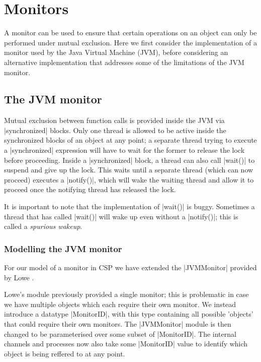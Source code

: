 \inlineCSP
\section{Monitors}

A monitor can be used to ensure that certain operations on an object can only be performed under mutual exclusion. Here we first consider the implementation of a monitor used by the Java Virtual Machine (JVM), before considering an alternative implementation that addresses some of the limitations of the JVM monitor.

\subsection{The JVM monitor}

Mutual exclusion between function calls is provided inside the JVM via |synchronized| blocks. Only one thread is allowed to be active inside the synchronized blocks of an object at any point; a separate thread trying to execute a |synchronized| expression will have to wait for the former to release the lock before proceeding. Inside a |synchronized| block, a thread can also call |wait()| to suspend and give up the lock. This waits until a separate thread (which can now proceed) executes a |notify()|, which will wake the waiting thread and allow it to proceed once the notifying thread has released the lock.

It is important to note that the implementation of |wait()| is buggy. Sometimes a thread that has called |wait()| will wake up even without a |notify()|; this is called a \emph{spurious wakeup}.




\subsubsection{Modelling the JVM monitor}

\inlineCSP

For our model of a monitor in CSP we have extended the |JVMMonitor| provided by Lowe \cite{LoweJVMMonitor}.

Lowe's module previously provided a single monitor; this is problematic in case we have multiple objects which each require their own monitor. We instead introduce a datatype |MonitorID|, with this type containing all possible 'objects' that could require their own monitors. The |JVMMonitor| module is then changed to be parameterised over some subset of |MonitorID|. The internal channels and processes now also take some |MonitorID| value to identify which object is being reffered to at any point.

